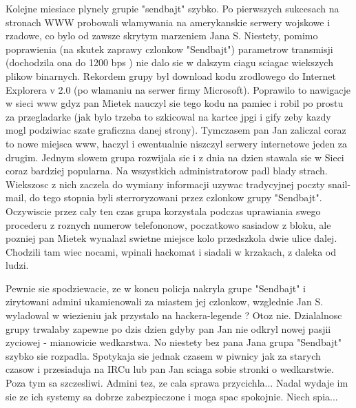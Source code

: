 \documentclass[a4paper,polish,titlepage,12pt]{article}
\begin{document}
Kolejne miesiace plynely grupie "sendbajt" szybko. Po pierwszych sukcesach na stronach WWW probowali wlamywania na amerykanskie serwery wojskowe i rzadowe, co bylo od zawsze skrytym marzeniem Jana S. Niestety, pomimo poprawienia (na skutek zaprawy czlonkow "Sendbajt") parametrow transmisji (dochodzila ona do 1200 bps ) nie dalo sie w dalszym ciagu sciagac wiekszych plikow binarnych. Rekordem grupy byl download kodu zrodlowego do Internet Explorera v 2.0 (po wlamaniu na serwer firmy Microsoft). Poprawilo to nawigacje w sieci www gdyz pan Mietek nauczyl sie tego kodu na pamiec i robil po prostu za przegladarke (jak bylo trzeba to szkicowal na kartce jpgi i gify zeby kazdy mogl podziwiac szate graficzna danej strony). Tymczasem pan Jan zaliczal coraz to nowe miejsca www, haczyl i ewentualnie niszczyl serwery internetowe jeden za drugim. Jednym slowem grupa rozwijala sie i z dnia na dzien stawala sie w Sieci coraz bardziej popularna. Na wszystkich administratorow padl blady strach. Wiekszosc z nich zaczela do wymiany informacji uzywac tradycyjnej poczty snail-mail, do tego stopnia byli sterroryzowani przez czlonkow grupy "Sendbajt". Oczywiscie przez caly ten czas grupa korzystala podczas uprawiania swego procederu z roznych numerow telefononow, poczatkowo sasiadow z bloku, ale pozniej pan Mietek wynalazl swietne miejsce kolo przedszkola dwie ulice dalej. Chodzili tam wiec nocami, wpinali hackomat i siadali w krzakach, z daleka od ludzi.

Pewnie sie spodziewacie, ze w koncu policja nakryla grupe "Sendbajt" i zirytowani admini ukamienowali za miastem jej czlonkow, wzglednie Jan S. wyladowal w wiezieniu jak przystalo na hackera-legende ? Otoz nie. Dzialalnosc grupy trwalaby zapewne po dzis dzien gdyby pan Jan nie odkryl nowej pasjii zyciowej - mianowicie wedkarstwa. No niestety bez pana Jana grupa "Sendbajt" szybko sie rozpadla. Spotykaja sie jednak czasem w piwnicy jak za starych czasow i przesiaduja na IRCu lub pan Jan sciaga sobie stronki o wedkarstwie. Poza tym sa szczesliwi. Admini tez, ze cala sprawa przycichla... Nadal wydaje im sie ze ich systemy sa dobrze zabezpieczone i moga spac spokojnie. Niech spia... 
\end{document}
